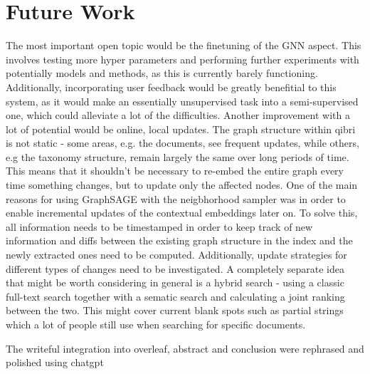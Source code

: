 \documentclass[draft,final]{vutinfth} %
\begin{document}
\section{Future Work}
The most important open topic would be the finetuning of the GNN aspect. This involves testing more hyper parameters and performing further experiments with potentially models and methods, as this is currently barely functioning. Additionally, incorporating user feedback would be greatly benefitial to this system, as it would make an essentially unsupervised task into a semi-supervised one, which could alleviate a lot of the difficulties. Another improvement with a lot of potential would be online, local updates. The graph structure within qibri is not static - some areas, e.g. the documents, see frequent updates, while others, e.g the taxonomy structure, remain largely the same over long periods of time. This means that it shouldn't be necessary to re-embed the entire graph every time something changes, but to update only the affected nodes. One of the main reasons for using GraphSAGE with the neigbhorhood sampler was in order to enable incremental updates of the contextual embeddings later on. To solve this, all information needs to be timestamped in order to keep track of new information and diffs between the existing graph structure in the index and the newly extracted ones need to be computed. Additionally, update strategies for different types of changes need to be investigated. A completely separate idea that might be worth considering in general is a hybrid search - using a classic full-text search together with a sematic search and calculating a joint ranking between the two. This might cover current blank spots such as partial strings which a lot of people still use when searching for specific documents.



\backmatter

\begin{aitools}
The writeful integration into overleaf, abstract and conclusion were rephrased and polished using chatgpt
\end{aitools}

\begin{kitools}
\end{kitools}

\listoffigures %

\cleardoublepage %
\listoftables %


\printindex

\printglossaries



\end{document}
